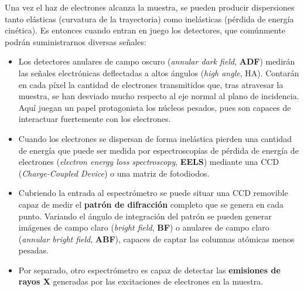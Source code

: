 Una vez el haz de electrones alcanza la muestra, se pueden producir dispersiones tanto elásticas (curvatura de la trayectoria) como inelásticas (pérdida de energía cinética). Es entonces cuando entran en juego los detectores, que comúnmente podrán suministrarnos diversas señales:

\begin{itemize}
    \item Los detectores anulares de campo oscuro (\textit{annular dark field}, \textbf{ADF}) medirán las señales electrónicas deflectadas a altos ángulos (\textit{high angle}, HA). Contarán en cada píxel la cantidad de electrones transmitidos que, tras atravesar la muestra, se han desviado mucho respecto al eje normal al plano de incidencia. Aquí juegan un papel protagonista los núcleos pesados, pues son capaces de interactuar fuertemente con los electrones.
    
    \item Cuando los electrones se dispersan de forma inelástica pierden una cantidad de energía que puede ser medida por espectroscopías de pérdida de energía de electrones (\textit{electron energy loss spectroscopy}, \textbf{EELS}) mediante una CCD (\textit{Charge-Coupled Device}) o una matriz de fotodiodos.
    
    \item Cubriendo la entrada al espectrómetro se puede situar una CCD removible capaz de medir el \textbf{patrón de difracción} completo que se genera en cada punto. Variando el ángulo de integración del patrón se pueden generar imágenes de campo claro (\textit{bright field}, \textbf{BF}) o anulares de campo claro (\textit{annular bright field}, \textbf{ABF}), capaces de captar las columnas atómicas menos pesadas.
    
    \item Por separado, otro espectrómetro es capaz de detectar las \textbf{emisiones de rayos X} generadas por las excitaciones de electrones en la muestra.
\end{itemize}

\vspace{0.1cm}

